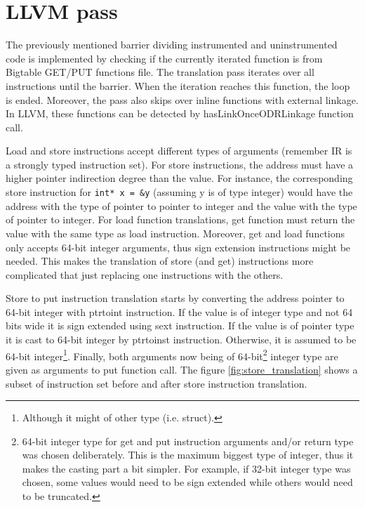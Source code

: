 \documentclass[bsc,frontabs,twoside,singlespacing,parskip,deptreport]{infthesis}     %
\begin{document}
\section{LLVM pass}

The previously mentioned barrier dividing instrumented and uninstrumented code is implemented by checking if the currently iterated function is from Bigtable GET/PUT functions file. The translation pass iterates over all instructions until the barrier. When the iteration reaches this function, the loop is ended. Moreover, the pass also skips over inline functions with external linkage.  In LLVM, these functions can be detected by hasLinkOnceODRLinkage function call. 

Load and store instructions accept different types of arguments (remember IR is a strongly typed instruction set). For store instructions, the address must have a higher pointer indirection degree than the value. For instance, the corresponding store instruction for \lstinline{int* x = &y} (assuming y is of type integer) would have the address with the type of pointer to pointer to integer and the value with the type of pointer to integer. For load function translations, get function must return the value with the same type as load instruction. Moreover, get and load functions only accepts 64-bit integer arguments, thus sign extension instructions might be needed. This makes the translation of store (and get) instructions more complicated that just replacing one instructions with the others.

Store to put instruction translation starts by converting the address pointer to 64-bit integer with ptrtoint instruction. If the value is of integer type and not 64 bits wide it is sign extended using sext instruction. If the value is of pointer type it is cast to 64-bit integer by ptrtoinst instruction. Otherwise, it is assumed to be 64-bit integer\footnote{Although it might of other type (i.e. struct).}. Finally, both arguments now being of 64-bit\footnote{64-bit integer type for get and put instruction arguments and/or return type was chosen deliberately. This is the maximum biggest type of integer, thus it makes the casting part a bit simpler. For example, if 32-bit integer type was chosen, some values would need to be sign extended while others would need to be truncated.} integer type are given as arguments to put function call. The figure \ref{fig:store_translation} shows a subset of instruction set before and after store instruction translation.
\end{document}
